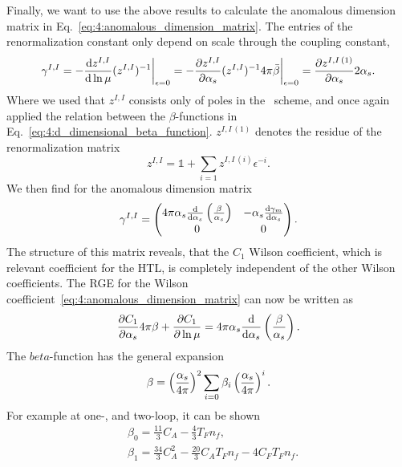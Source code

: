 Finally, we want to use the above results to calculate the anomalous dimension matrix in Eq.~\eqref{eq:4:anomalous_dimension_matrix}. The entries of the renormalization constant only depend on scale through the coupling constant, \ie\
\begin{equation}
\gamma^{I,I} = -\frac{\mathrm{d} z^{I,I}}{\mathrm{d} \ln \mu} (z^{I,I})^{-1} \bigg \vert_{\epsilon = 0} = -\frac{\partial z^{I,I}}{\partial \alpha_s} (z^{I,I})^{-1} 4 \pi \bar{\beta} \bigg \vert_{\epsilon = 0} = \frac{\partial z^{I,I\,(1)}}{\partial \alpha_s} 2 \alpha_s.
\end{equation}
Where we used that $z^{I,I}$ consists only of poles in the \MS\ scheme, and once again applied the relation between the $\beta$-functions in Eq.~\eqref{eq:4:d_dimensional_beta_function}. $z^{I,I\, (1)}$ denotes the residue of the renormalization matrix
\begin{equation}
z^{I,I} = \mathbb{1} + \sum_{i = 1} z^{I,I\,(i)} \epsilon^{-i}.
\end{equation}
We then find for the anomalous dimension matrix
\begin{equation}
\gamma^{I,I} = \begin{pmatrix} 4 \pi \alpha_s \frac{\mathrm{d}}{\mathrm{d} \alpha_s} \left( \frac{\beta}{\alpha_s} \right) & - \alpha_s \frac{\mathrm{d} \gamma_m}{\mathrm{d} \alpha_s} \\
0 & 0 \end{pmatrix}.
\end{equation}
The structure of this matrix reveals, that the $C_1$ Wilson coefficient, which is relevant coefficient for the  \acs{HTL}, is completely independent of the other Wilson coefficients. The \acs{RGE} for the Wilson coefficient~\eqref{eq:4:anomalous_dimension_matrix} can now be written as \
\begin{equation}
\frac{\partial C_1}{\partial \alpha_s} 4 \pi \beta + \frac{\partial C_1}{\partial \ln \mu} = 4 \pi \alpha_s \frac{\mathrm{d} }{\mathrm{d} \alpha_s} \left(\frac{\beta}{\alpha_s} \right).
\label{eq:4:RGE_of_C1}
\end{equation}
The $beta$-function has the general expansion
\begin{equation}
\beta = \left(\frac{\alpha_s}{4 \pi} \right)^2 \sum_{i = 0} \beta_i \left(\frac{\alpha_s}{4 \pi} \right)^i.
\end{equation}
For example at one-, and two-loop, it can be shown~\cite{Gross:1973id, Politzer:1973fx, tHooft:1972ikm, Caswell:1974gg, Jones:1974mm, Egorian:1978zx}
\begin{equation}
\begin{split}
&\beta_0 = \frac{11}{3} C_A - \frac{4}{3} T_F n_f, \\
&\beta_1 = \frac{34}{3} C_A^2 - \frac{20}{3} C_A T_F n_f - 4 C_F T_F n_f.
\end{split}
\end{equation}
